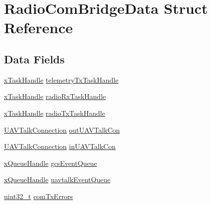 \hypertarget{struct_radio_com_bridge_data}{\section{Radio\-Com\-Bridge\-Data Struct Reference}
\label{struct_radio_com_bridge_data}
}
\subsection*{Data Fields}
\begin{DoxyCompactItemize}
\item 
\hyperlink{_common_2_libraries_2_free_r_t_o_s_2_source_2include_2task_8h_a271ae40d5db07d928a113766505a0965}{x\-Task\-Handle} \hyperlink{group___radio_com_bridge_module_ga189160ac3985d53d095bce400a1a7a5f}{telemetry\-Tx\-Task\-Handle}
\item 
\hyperlink{_common_2_libraries_2_free_r_t_o_s_2_source_2include_2task_8h_a271ae40d5db07d928a113766505a0965}{x\-Task\-Handle} \hyperlink{group___radio_com_bridge_module_ga4c820a9e2bc40a76c43488fa46c8483e}{radio\-Rx\-Task\-Handle}
\item 
\hyperlink{_common_2_libraries_2_free_r_t_o_s_2_source_2include_2task_8h_a271ae40d5db07d928a113766505a0965}{x\-Task\-Handle} \hyperlink{group___radio_com_bridge_module_gaf39b9a5475db119fb3e7502f1c73ac16}{radio\-Tx\-Task\-Handle}
\item 
\hyperlink{group___open_pilot_libraries_gaeff1721eaebd4ab306057b4017f23f36}{U\-A\-V\-Talk\-Connection} \hyperlink{group___radio_com_bridge_module_gafd3b3b69c1cdea1fed445a0c2fd40319}{out\-U\-A\-V\-Talk\-Con}
\item 
\hyperlink{group___open_pilot_libraries_gaeff1721eaebd4ab306057b4017f23f36}{U\-A\-V\-Talk\-Connection} \hyperlink{group___radio_com_bridge_module_gaf682c724d4e325caaccb297cc349911d}{in\-U\-A\-V\-Talk\-Con}
\item 
\hyperlink{_common_2_libraries_2_free_r_t_o_s_2_source_2include_2queue_8h_a229037f755b756156e34a440ce134b8b}{x\-Queue\-Handle} \hyperlink{group___radio_com_bridge_module_gaacd7e5ae2cc543712ed4902c62ea4114}{gcs\-Event\-Queue}
\item 
\hyperlink{_common_2_libraries_2_free_r_t_o_s_2_source_2include_2queue_8h_a229037f755b756156e34a440ce134b8b}{x\-Queue\-Handle} \hyperlink{group___radio_com_bridge_module_gadf0a6424f27b6767c1633071f3867154}{uavtalk\-Event\-Queue}
\item 
\hyperlink{stdint_8h_a435d1572bf3f880d55459d9805097f62}{uint32\-\_\-t} \hyperlink{group___radio_com_bridge_module_ga70614241d844e1b9501d0ba2fee0d2a3}{com\-Tx\-Errors}

\end{DoxyCompactItemize}
